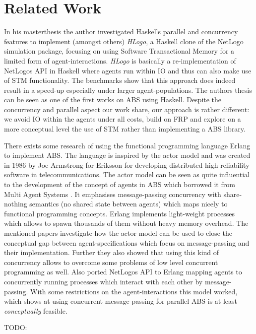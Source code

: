 \section{Related Work}
In his masterthesis \cite{bezirgiannis_improving_2013} the author investigated Haskells parallel and concurrency features to implement (amongst others) \textit{HLogo}, a Haskell clone of the NetLogo simulation package, focusing on using Software Transactional Memory for a limited form of agent-interactions. \textit{HLogo} is basically a re-implementation of NetLogos API in Haskell where agents run within IO and thus can also make use of STM functionality. The benchmarks show that this approach does indeed result in a speed-up especially under larger agent-populations. The authors thesis can be seen as one of the first works on ABS using Haskell. Despite the concurrency and parallel aspect our work share, our approach is rather different: we avoid IO within the agents under all costs, build on FRP and explore on a more conceptual level the use of STM rather than implementing a ABS library.

There exists some research \cite{di_stefano_using_2005, varela_modelling_2004, sher_agent-based_2013} of using the functional programming language Erlang \cite{armstrong_erlang_2010} to implement ABS. The language is inspired by the actor model \cite{agha_actors:_1986} and was created in 1986 by Joe Armstrong for Eriksson for developing distributed high reliability software in telecommunications. The actor model can be seen as quite influential to the development of the concept of agents in ABS which borrowed it from Multi Agent Systems \cite{wooldridge_introduction_2009}. It emphasises message-passing concurrency with share-nothing semantics (no shared state between agents) which maps nicely to functional programming concepts. Erlang implements light-weight processes which allows to spawn thousands of them without heavy memory overhead. The mentioned papers investigate how the actor model can be used to close the conceptual gap between agent-specifications which focus on message-passing and their implementation. Further they also showed that using this kind of concurrency allows to overcome some problems of low level concurrent programming as well.
Also \cite{bezirgiannis_improving_2013} ported NetLogos API to Erlang mapping agents to concurrently running processes which interact with each other by message-passing. With some restrictions on the agent-interactions this model worked, which shows at using concurrent message-passing for parallel ABS is at least \textit{conceptually} feasible.

TODO: %